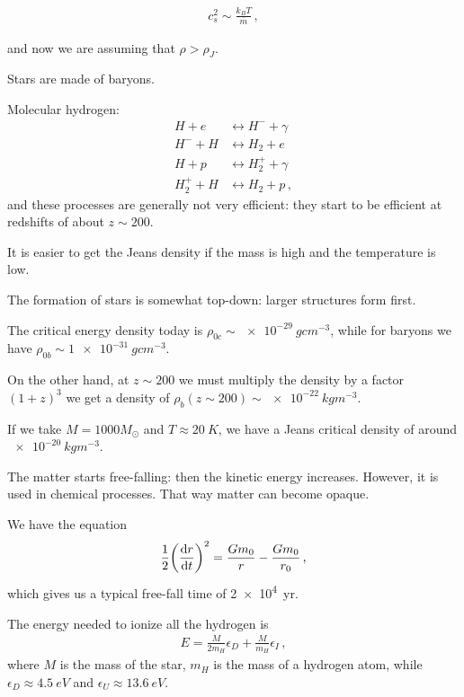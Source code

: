 \documentclass[main.tex]{subfiles}
\begin{document}
%
\begin{align}
  c_s^2 \sim \frac{k_B T}{\overline{m}}
\,,
\end{align}
%

and now we are assuming that \(\rho > \rho _J\). 

Stars are made of baryons. 

Molecular hydrogen: 
%
\begin{align}
  H + e &\leftrightarrow H^{-} + \gamma  \\
  H^{-} + H &\leftrightarrow H_2 + e  \\
   H+ p &\leftrightarrow H_2^{+} + \gamma  \\
  H_2^{+} + H &\leftrightarrow H_2 + p
\,,
\end{align}
%
and these processes are generally not very efficient: they start to be efficient at redshifts of about \(z \sim 200\). 

It is easier to get the Jeans density if the mass is high and the temperature is low. 

The formation of stars is somewhat top-down: larger structures form first. 

The critical energy density today is  \(\rho_{0c} \sim \SI{e-29}{g cm^{-3}}\), while for baryons we have \(\rho_{0b} \sim \SI{1e-31}{g cm^{-3}}\). 

On the other hand, at \(z \sim 200 \) we must multiply the density by a factor \((1+z)^3\) we get a density of \(\rho_{b} (z \sim 200) \sim \SI{e-22}{kg m^{-3}}\). 

If we take \(M = 1000 M_{\odot}\) and \(T \approx \SI{20}{K}\), we have a Jeans critical density of around \(\SI{e-20}{kg m^{-3}}\). 


The matter starts free-falling: then the kinetic energy increases. 
However, it is used in chemical processes. That way matter can become opaque. 

We have the equation 
%
\begin{align}
  \frac{1}{2} \qty(\dv{r}{t})^2 = \frac{G m_0 }{r} - \frac{G m_0 }{r_0 }
\,,
\end{align}
%
which gives us a typical free-fall time of \SI{2e4}{yr}. 

The energy needed to ionize all the hydrogen is 
%
\begin{align}
  E = \frac{M}{2 m_H} \epsilon_{D} + \frac{M}{m_H} \epsilon_{I}
\,,
\end{align}
%
where \(M\) is the mass of the star, \(m_H\) is the mass of a hydrogen atom, while \(\epsilon_{D} \approx \SI{4.5}{eV}\) and \(\epsilon_{U} \approx \SI{13.6}{eV}\). 
\end{document}
